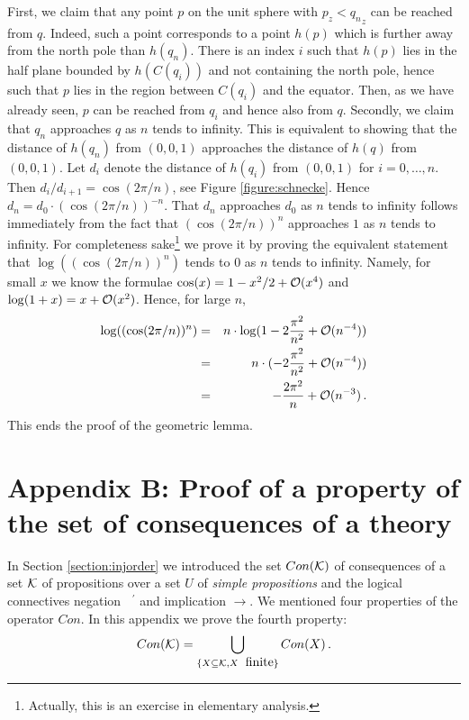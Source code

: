 %
First, we claim that any point $p$ on the unit sphere with
$p_z < {q_n}_z$ can be reached from $q$. Indeed, such a point
corresponds to a point $h(p)$ which is further away from the
north pole than $h(q_n)$.
There is an index $i$
such that $h(p)$ lies in the half plane bounded by  $h(C(q_i))$
and not containing the north pole, hence such that
$p$ lies in the region between $C({q_i})$ and the equator.
Then, as we have already seen, $p$ can be reached from
$q_i$ and hence also from $q$.
Secondly, we claim that $q_n$ approaches
$q$ as $n$ tends to infinity. This is equivalent to
showing that the distance of $h(q_n)$ from $(0,0,1)$
approaches the distance of $h(q)$ from $(0,0,1)$.
Let $d_i$ denote the distance of $h(q_i)$ from $(0,0,1)$
for $i=0,\ldots,n$. Then
$d_i / d_{i+1} = \cos(2\pi/n)$, see Figure
\ref{figure:schnecke}. Hence
$d_n = d_0 \cdot (\cos(2\pi/n))^{-n}$.
That $d_n$ approaches $d_0$ as $n$ tends to infinity
follows immediately from the fact that
$(\cos(2\pi/n))^n$ approaches $1$ as $n$ tends to infinity.
 For
completeness sake\footnote{Actually, this is an exercise in elementary
analysis.} we prove it by
proving the equivalent statement that $\log((\cos(2\pi/n))^n)$ tends to $0$
as $n$ tends to
infinity. Namely, for small $x$ we know the formulae
$\cos(x)=1-x^2/2 + {\cal O}(x^4)$ and
$\log(1+x)=x+{\cal O}(x^2)$.
Hence, for large $n$,
\begin{eqnarray*}
   \log((\cos(2\pi/n))^n) & = &
      n \cdot \log(1-2{\pi^2 \over n^2} + {\cal O}(n^{-4})) \\
   & = & n \cdot ( - 2 {\pi^2 \over n^2} + {\cal O}(n^{-4}))\\
       & = & - {2 \pi^2 \over n} + {\cal O}(n^{-3}) \, .
\end{eqnarray*}
This ends the proof of the geometric lemma.


\appendix
\section*{Appendix B: Proof of a property of the set of consequences
of a theory}

In Section \ref{section:injorder} we introduced
the set $Con({\cal K})$ of consequences of a set ${\cal K}$
of propositions over a set $U$ of {\em simple propositions} and
the logical connectives negation $\phantom{x}^\prime$ and
implication $\rightarrow$.
We mentioned four properties of the operator $Con$.
In this appendix we prove the fourth property:
\[ Con({\cal K}) = \bigcup_{\{X\subseteq {\cal K}, X
\;\mbox{ finite}\}} Con(X) \,.\]

